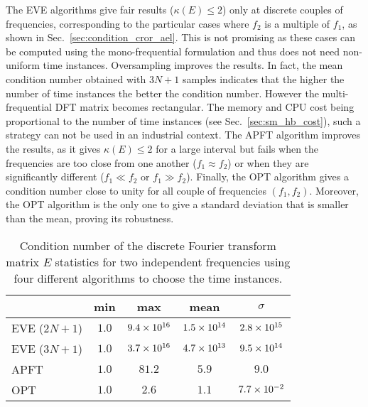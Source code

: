 The EVE algorithms give fair results ($\kappa(E) \leq 2$) only at
discrete couples of frequencies, corresponding 
to the particular cases where $f_2$ is a
multiple of $f_1$, as shown in Sec.~\ref{sec:condition_cror_ael}. 
This is not promising as these
cases can be computed using the mono-frequential formulation and thus does not
need non-uniform time instances. Oversampling improves the results. 
In fact, the mean condition number obtained
with $3N + 1$ samples indicates that the higher the number of time instances
the better the condition number. However the multi-frequential DFT
matrix becomes rectangular. The memory and CPU cost being proportional to 
the number of time instances (see Sec.~\ref{sec:sm_hb_cost}), 
such a strategy can not be
used in an industrial context. The APFT
algorithm improves the results, as it gives $\kappa (E) \leq 2$ 
for a large interval but fails when the frequencies
are too close from one another ($f_1 \approx f_2$) or when they are significantly
different ($f_1 \ll f_2$ or $f_1 \gg f_2$).  
Finally, the OPT algorithm gives a condition number close to unity for
all couple of frequencies $(f_1, f_2)$. Moreover, the OPT algorithm is
the only one to give a standard deviation that is smaller than the mean,
proving its robustness.
\begin{table}[htp]
  \centering
  \begin{tabular}{lcccc}
    \toprule
    \phantom{abdefghijk} & min & max & mean & $\sigma$ \\
    \midrule
    EVE ($2N + 1$) & $1.0$ & $9.4\times 10^{16}$ & $1.5\times 10^{14}$ & $2.8\times 10^{15}$ \\
    EVE ($3N + 1$) & $1.0$ & $3.7\times 10^{16}$ & $4.7\times 10^{13}$ & $9.5\times 10^{14}$ \\
    APFT & $1.0$ & $81.2$ & $5.9$ & $9.0$ \\
    OPT & $1.0$ & $2.6$ & $1.1$ & $7.7\times 10^{-2}$ \\
    \bottomrule
  \end{tabular}
  \caption{Condition number of the discrete Fourier transform matrix $E$
  statistics for two independent frequencies using four different algorithms
  to choose the time instances.}
  \label{tab:algo_sum}
\end{table} 

